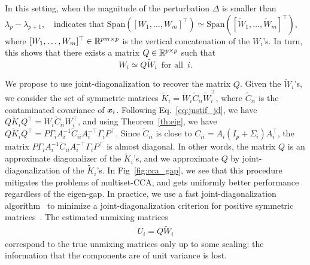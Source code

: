 In this setting, when the magnitude of the perturbation $\Delta$ is smaller than $\lambda_{p}-\lambda_{p+1}$, ~\cite{stewart1973error} indicates that $\mathrm{Span}([W_1, \dots, W_m]^{\top})\simeq \mathrm{Span}([\tilde{W}_1,\dots, \tilde{W}_m]^\top)$, where $[W_1, \dots, W_m]^{\top}\in\mathbb{R}^{pm\times p}$ is the vertical concatenation of the $W_i$'s.
In turn, this shows that there exists a matrix $Q\in\mathbb{R}^{p\times p}$ such that
%
%
\begin{equation}
    \label{eq:justif_jd}
    W_i \simeq Q\tilde{W}_i\enspace \text{for all} \enspace i.
\end{equation}

We propose to use joint-diagonalization to recover the matrix $Q$. Given the $\tilde{W}_i$'s, we consider the set of symmetric matrices $\tilde{K}_i = \tilde{W}_i\tilde{C}_{ii}\tilde{W}_i^{\top}$, where $\tilde{C}_{ii}$ is the contaminated covariance of $\boldsymbol{x}_i$. Following Eq.~\eqref{eq:justif_jd}, we have $Q\tilde{K}_iQ^{\top} = W_i \tilde{C}_{ii}W_i^{\top}$, and using Theorem~\ref{th:eig}, we have $Q\tilde{K}_iQ^{\top} = P\Gamma_i A_i^{-1}\tilde{C}_{ii}A_i^{-\top}\Gamma_iP^{\top}$. Since $\tilde{C}_{ii}$ is close to $C_{ii} = A_i (I_p + \Sigma_i)A_i^\top$, the matrix $P\Gamma_i A_i^{-1}\tilde{C}_{ii}A_i^{-\top}\Gamma_iP^{\top}$ is almost diagonal.
%
In other words, the matrix $Q$ is an approximate diagonalizer of the $\tilde{K}_i$'s, and we approximate $Q$ by joint-diagonalization of the $\tilde{K}_i$'s. In Fig~\ref{fig:cca_gap}, we see that this procedure mitigates the problems of multiset-CCA, and gets uniformly better performance regardless of the eigen-gap.
%
In practice, we use a fast joint-diagonalization
algorithm~\cite{ablin2018beyond} to minimize a joint-diagonalization criterion
for positive symmetric matrices~\cite{pham2001joint}. The estimated unmixing
matrices
\begin{align}
U_i = Q\tilde{W}_i
\end{align}
correspond to the true unmixing matrices only up to some scaling: the information that the components are of unit variance is lost.

